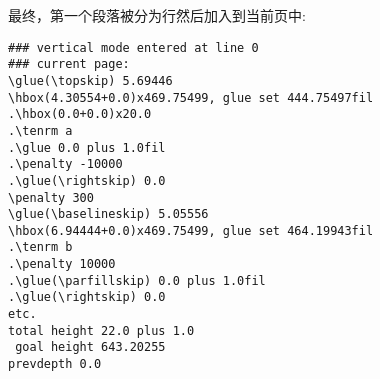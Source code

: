 \documentclass{book}
\begin{document}
最终，第一个段落被分为行然后加入到当前页中:
\begin{verbatim}
### vertical mode entered at line 0
### current page:
\glue(\topskip) 5.69446
\hbox(4.30554+0.0)x469.75499, glue set 444.75497fil
.\hbox(0.0+0.0)x20.0
.\tenrm a
.\glue 0.0 plus 1.0fil
.\penalty -10000
.\glue(\rightskip) 0.0
\penalty 300
\glue(\baselineskip) 5.05556
\hbox(6.94444+0.0)x469.75499, glue set 464.19943fil
.\tenrm b
.\penalty 10000
.\glue(\parfillskip) 0.0 plus 1.0fil
.\glue(\rightskip) 0.0
etc.
total height 22.0 plus 1.0
 goal height 643.20255
prevdepth 0.0
\end{verbatim}


\endofchapter
\end{document}
